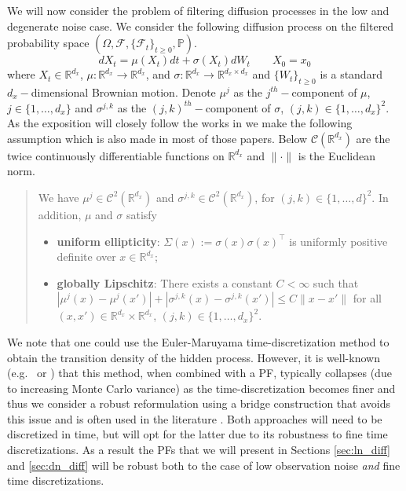 \documentclass[english,13pt]{article}
\numberwithin{equation}{section}
\begin{document}
We will now consider the problem of filtering diffusion processes in the low and degenerate noise case.
We consider the following diffusion process on the filtered probability space $(\Omega,\mathscr{F},\{\mathscr{F}_t\}_{t\geq 0},\mathbb{P})$.  
\begin{equation}
dX_t = \mu(X_t)dt + \sigma(X_t)dW_t\quad\quad X_0=x_0\label{eq:diff}
\end{equation}
where $X_t\in\mathbb{R}^{d_x}$,   
$\mu:\mathbb{R}^{d_x} \rightarrow\mathbb{R}^{d_x}$, 
and $\sigma:\mathbb{R}^{d_x} \rightarrow\mathbb{R}^{d_x\times d_x}$
and $\{W_t\}_{t\geq 0}$ is a standard $d_x-$dimensional Brownian motion.
Denote $\mu^j$ as the $j^{th}-$component of $\mu$, $j\in\{1,\dots,d_x\}$
and $\sigma^{j,k}$ as the $(j,k)^{th}-$component of $\sigma$, $(j,k)\in\{1,\dots,d_x\}^2$.
As the exposition will closely follow the works in \cite{diff_bridge,beskos,non_synch,stanton} we make the following assumption which is also made in most of those papers.  Below $\mathcal{C}(\mathbb{R}^{d_x})$ are the twice continuously differentiable functions on $\mathbb{R}^{d_x}$ and $\|\cdot\|$ is the Euclidean norm.
\begin{quote} 
We have $\mu^j\in \mathcal{C}^2(\mathbb{R}^{d_x})$ and $\sigma^{j,k} \in \mathcal{C}^2(\mathbb{R}^{d_x})$, for $(j,k)\in\{1,\ldots, d\}^2$. 
In addition, $\mu$ and $\sigma$ satisfy 
\begin{itemize}
\item[(i)] {\bf uniform ellipticity}: $\Sigma(x):=\sigma(x)\sigma(x)^{\top}$ is uniformly positive definite 
over $x\in \mathbb{R}^{d_x}$;
\item[(ii)] {\bf globally Lipschitz}:
There exists a constant $C<\infty$ such that 
$|\mu^j(x)-\mu^j(x')|+|\sigma^{j,k}(x)-\sigma^{j,k}(x')| \leq C \|x-x'\|$ 
for all $(x,x') \in \mathbb{R}^{d_x}\times\mathbb{R}^{d_x}$, $(j,k)\in\{1,\dots,d_x\}^2$. 
\end{itemize}
\end{quote}
We note that one could use the Euler-Maruyama time-discretization method to obtain the transition density of the hidden process.  However,  it is well-known (e.g.~\cite{beskos} or \cite[Figure 1]{shouto}) that this method, when combined with a PF,  typically collapses (due to increasing Monte Carlo variance) as the time-discretization becomes finer and thus we consider a robust reformulation using a bridge construction that avoids this issue and is often used in the literature \cite{schauer,vd_meulen_guided_mcmc}. Both approaches will need to be discretized in time, but will opt for the latter due to its robustness to fine time discretizations. As a result the PFs that we will present in Sections \ref{sec:ln_diff} and \ref{sec:dn_diff} will be robust both to the case of low observation noise \emph{and} fine time discretizations.
\end{document}
